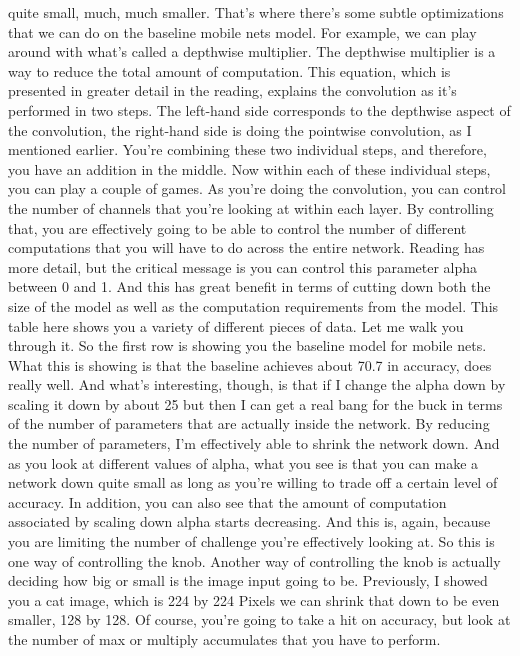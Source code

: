 quite small, much, much smaller.
That's where there's some subtle optimizations that we can
do on the baseline mobile nets model.
For example, we can play around with what's called a depthwise multiplier.
The depthwise multiplier is a way to reduce the total amount of computation.
This equation, which is presented in greater detail in the reading,
explains the convolution as it's performed in two steps.
The left-hand side corresponds to the depthwise aspect of the convolution,
the right-hand side is doing the pointwise convolution,
as I mentioned earlier.
You're combining these two individual steps,
and therefore, you have an addition in the middle.
Now within each of these individual steps, you can play a couple of games.
As you're doing the convolution, you can control the number of channels
that you're looking at within each layer.
By controlling that, you are effectively going
to be able to control the number of different computations
that you will have to do across the entire network.
Reading has more detail, but the critical message
is you can control this parameter alpha between 0 and 1.
And this has great benefit in terms of cutting down both the size of the model
as well as the computation requirements from the model.
This table here shows you a variety of different pieces of data.
Let me walk you through it.
So the first row is showing you the baseline model for mobile nets.
What this is showing is that the baseline achieves about 70.7%
in accuracy, does really well.
And what's interesting, though, is that if I change the alpha down by scaling
it down by about 25%
but then I can get a real bang for the buck
in terms of the number of parameters that are actually inside the network.
By reducing the number of parameters, I'm effectively
able to shrink the network down.
And as you look at different values of alpha, what you see
is that you can make a network down quite small
as long as you're willing to trade off a certain level of accuracy.
In addition, you can also see that the amount of computation
associated by scaling down alpha starts decreasing.
And this is, again, because you are limiting the number of challenge
you're effectively looking at.
So this is one way of controlling the knob.
Another way of controlling the knob is actually deciding how big or small
is the image input going to be.
Previously, I showed you a cat image, which
is 224 by 224 Pixels we can shrink that down to be even smaller, 128 by 128.
Of course, you're going to take a hit on accuracy, but look at the number of max
or multiply accumulates that you have to perform.
